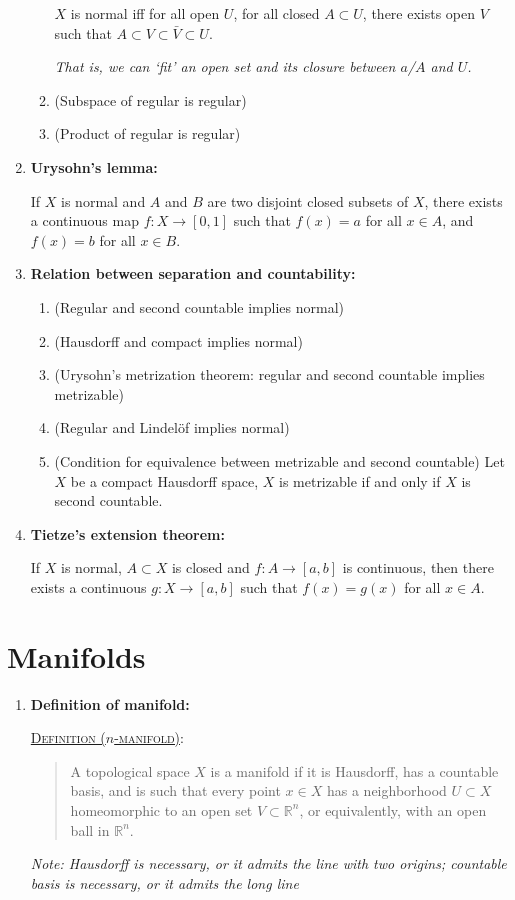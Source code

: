 \documentclass[letterpaper, 12pt]{article}
\newcommand{\RR}{\mathbb{R}}
\newcommand{\defn}[2]{\textsc{\underline{Definition (#1)}:}\begin{quote} #2\end{quote}}
\begin{document}
\begin{enumerate}[resume]
\begin{enumerate}
            $X$ is normal iff for all open $U$, for all closed $A\subset U$, there exists open $V$ such that $A\subset V\subset \bar V \subset U$.

            \textit{That is, we can `fit' an open set and its closure between $a$/$A$ and $U$.}
        \item (Subspace of regular is regular)
        \item (Product of regular is regular)
        \end{enumerate}
    \item \textbf{Urysohn's lemma:}

        If $X$ is normal and $A$ and $B$ are two disjoint closed subsets of $X$, there exists a continuous map $f : X\to [0,1]$ such that $f(x) = a$ for all $x\in A$, and $f(x) = b$ for all $x\in B$. %
    \item \textbf{Relation between separation and countability:}
        \begin{enumerate}
        \item (Regular and second countable implies normal)
        \item (Hausdorff and compact implies normal)
        \item (Urysohn's metrization theorem: regular and second countable implies metrizable) %
        \item (Regular and Lindel\"of implies normal)
        \item (Condition for equivalence between metrizable and second countable) Let $X$ be a compact Hausdorff space, $X$ is metrizable if and only if $X$ is second countable.
        \end{enumerate}
    \item \textbf{Tietze's extension theorem:}

        If $X$ is normal, $A\subset X$ is closed and $f : A\to [a,b]$ is continuous, then there exists a continuous $g : X\to [a,b]$ such that $f(x) = g(x)$ for all $x\in A$. %
    \end{enumerate}

\section{Manifolds}
    \begin{enumerate}[resume]
    \item \textbf{Definition of manifold:}

        \defn{$n$-manifold}{A topological space $X$ is a manifold if it is Hausdorff, has a countable basis, and is such that every point $x\in X$ has a neighborhood $U\subset X$ homeomorphic to an open set $V\subset\RR^n$, or equivalently, with an open ball in $\RR^n$.}

        \textit{Note: Hausdorff is necessary, or it admits the line with two origins; countable basis is necessary, or it admits the long line}
    \end{enumerate}
\end{document}
